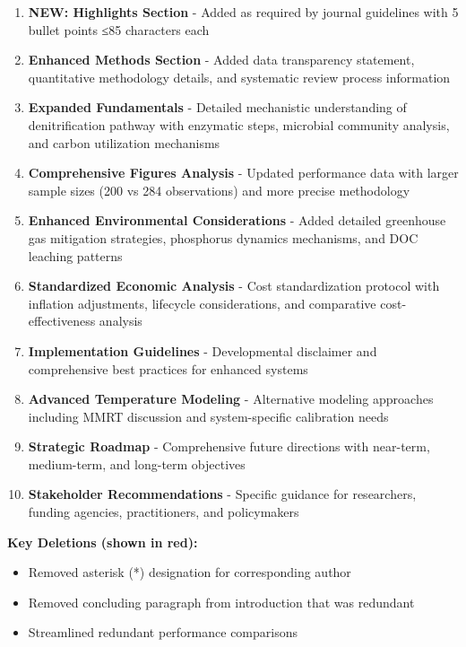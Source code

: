\documentclass[12pt,a4paper]{article}
\begin{document}
\begin{enumerate}
\item \textbf{NEW: Highlights Section} - Added as required by journal guidelines with 5 bullet points ≤85 characters each
\item \textbf{Enhanced Methods Section} - Added data transparency statement, quantitative methodology details, and systematic review process information
\item \textbf{Expanded Fundamentals} - Detailed mechanistic understanding of denitrification pathway with enzymatic steps, microbial community analysis, and carbon utilization mechanisms
\item \textbf{Comprehensive Figures Analysis} - Updated performance data with larger sample sizes (200 vs 284 observations) and more precise methodology
\item \textbf{Enhanced Environmental Considerations} - Added detailed greenhouse gas mitigation strategies, phosphorus dynamics mechanisms, and DOC leaching patterns
\item \textbf{Standardized Economic Analysis} - Cost standardization protocol with inflation adjustments, lifecycle considerations, and comparative cost-effectiveness analysis
\item \textbf{Implementation Guidelines} - Developmental disclaimer and comprehensive best practices for enhanced systems
\item \textbf{Advanced Temperature Modeling} - Alternative modeling approaches including MMRT discussion and system-specific calibration needs
\item \textbf{Strategic Roadmap} - Comprehensive future directions with near-term, medium-term, and long-term objectives
\item \textbf{Stakeholder Recommendations} - Specific guidance for researchers, funding agencies, practitioners, and policymakers
\end{enumerate}

\textbf{\textcolor{deletedtext}{Key Deletions (shown in red):}}
\begin{itemize}
\item Removed asterisk (*) designation for corresponding author
\item Removed concluding paragraph from introduction that was redundant
\item Streamlined redundant performance comparisons
\end{itemize}
\end{document}
